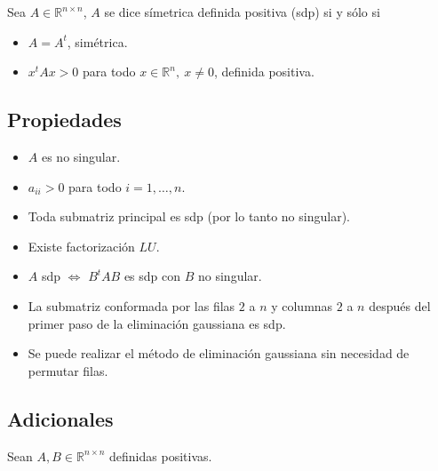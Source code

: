 
Sea $A \in \mathbb{R}^{n \times n}$, $A$ se dice símetrica definida positiva (sdp) si y sólo si

\begin{itemize}
    \item $A = A^t$, simétrica.
    \item $x^{t}Ax > 0$ para todo $x \in \mathbb{R}^{n},~ x \neq 0$, definida positiva.
\end{itemize}

\subsection{Propiedades}\label{matrices_sdp_propiedades}

\begin{itemize}
    \item $A$ es no singular.
    \item $a_{ii} > 0$ para todo $i = 1,\ldots,n$.
    \item Toda submatriz principal es sdp (por lo tanto no singular).
    \item Existe factorización $LU$.
    \item $A$ sdp $\iff$ $B^{t}AB$ es sdp con $B$ no singular.
    \item La submatriz conformada por las filas $2$ a $n$ y columnas $2$ a $n$ después del primer paso de
    la eliminación gaussiana es sdp.
    \item Se puede realizar el método de eliminación gaussiana sin necesidad de permutar filas.
\end{itemize}

\subsection{Adicionales}\label{matrices_sdp_adicionales}

\noindent Sean $A,B \in \mathbb{R}^{n \times n}$ definidas positivas.

